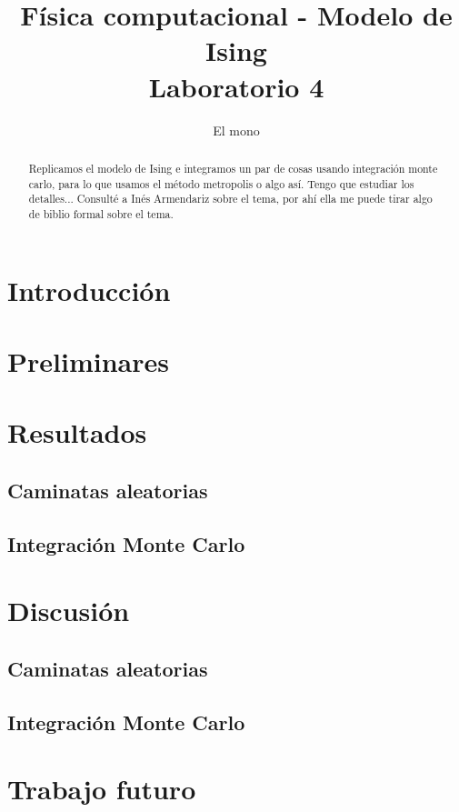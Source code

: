 \documentclass[a4paper,12pt]{article}
\title{Física computacional - Modelo de Ising \\ Laboratorio 4}
\author{El mono}
\date{}
\begin{document}
\maketitle

\begin{abstract}
    Replicamos el modelo de Ising e integramos un par de cosas usando integración monte carlo, para lo que usamos el método metropolis o algo así. Tengo que estudiar los detalles... Consulté a Inés Armendariz sobre el tema, por ahí ella me puede tirar algo de biblio formal sobre el tema.
\end{abstract}

\section{Introducción}

\section{Preliminares}
\label{sec:preliminares}

\section{Resultados}

\subsection{Caminatas aleatorias}

\subsection{Integración Monte Carlo}

\section{Discusión}

\subsection{Caminatas aleatorias}
\label{sec:discusion:rw}

\subsection{Integración Monte Carlo}
\label{sec:discusion:mc}

\section{Trabajo futuro}
\end{document}
